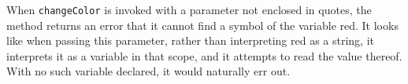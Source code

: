 When \verb|changeColor| is invoked with a parameter not enclosed in
quotes, the method returns an error that it cannot find a symbol of the
variable red. It looks like when passing this parameter, rather than
interpreting red as a string, it interprets it as a variable in that
scope, and it attempts to read the value thereof. With no such variable
declared, it would naturally err out.
